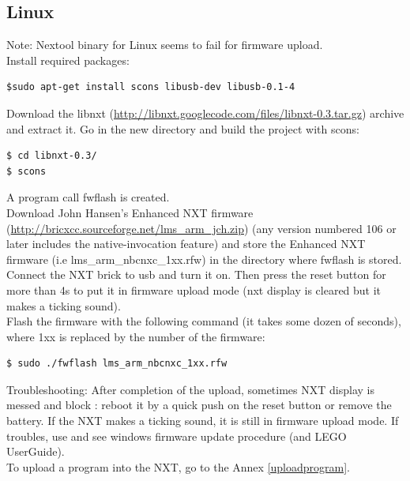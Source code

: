 \subsection{Linux}
Note: Nextool binary for Linux seems to fail for firmware upload.\\
Install required packages:
\begin{verbatim}
$sudo apt-get install scons libusb-dev libusb-0.1-4
\end{verbatim}
Download the libnxt (\href{http://libnxt.googlecode.com/files/libnxt-0.3.tar.gz}{http://libnxt.googlecode.com/files/libnxt-0.3.tar.gz}) archive and extract it. Go in the new directory and build the project with scons:
\begin{verbatim}
$ cd libnxt-0.3/ 
$ scons
\end{verbatim}

A program call fwflash is created.\\
Download John Hansen's Enhanced NXT firmware (\href{http://bricxcc.sourceforge.net/lms_arm_jch.zip}{http://bricxcc.sourceforge.net/lms\_arm\_jch.zip}) (any version numbered 106 or later includes the native-invocation feature) and store the Enhanced NXT firmware (i.e lms\_arm\_nbcnxc\_1xx.rfw) in the directory where fwflash is stored.\\
Connect the NXT brick to usb and turn it on. Then press the reset button for more than 4s to put it in firmware upload mode (nxt display is cleared but it makes a ticking sound).\\
Flash the firmware with the following command (it takes some dozen of seconds), where 1xx is replaced by the number of the firmware:
\begin{verbatim}
$ sudo ./fwflash lms_arm_nbcnxc_1xx.rfw
\end{verbatim}

Troubleshooting: After completion of the upload, sometimes NXT display is messed and block : reboot it by a quick push on the reset button or remove the battery. If the NXT makes a ticking sound, it is still in firmware upload mode. If troubles, use and see windows firmware update procedure (and LEGO UserGuide).\\

To upload a program into the NXT, go to the Annex \ref{uploadprogram}.

